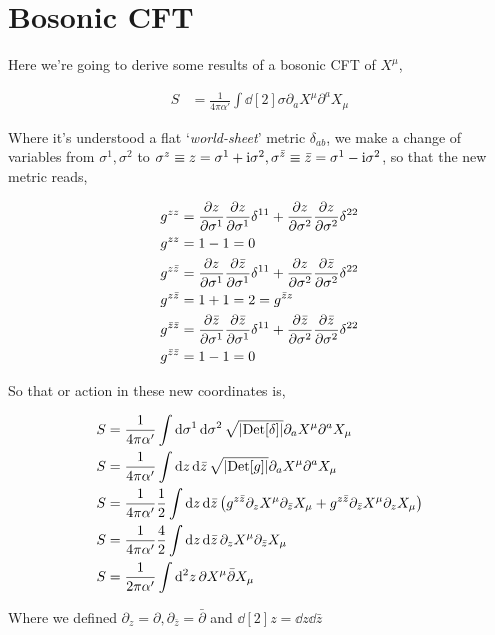 \section{Bosonic CFT}

Here we're going to derive some results of a bosonic CFT of $X^\mu$,

\begin{align*}
    S&=\frac{1}{4\pi\alpha'}\int\dd[2]{\sigma}\partial_a X^\mu\partial^a X_\mu
\end{align*}

Where it's understood a flat `\textit{world-sheet}' metric $\delta_{ab}$, we make a change of variables from $\sigma^1,\sigma^2$ to 
$\sigma^z\equiv z=\sigma^1+\textnormal{i} \sigma^2,\sigma^{\bar z}\equiv \bar z=\sigma^1-\textnormal{i} \sigma^2$, so that the new metric reads,

\begin{align*}
    g^{zz}&=\pdv{z}{\sigma^1}\pdv{z}{\sigma^1}\delta^{11}+\pdv{z}{\sigma^2}\pdv{z}{\sigma^2}\delta^{22}\\
    g^{zz}&=1-1=0\\
    g^{z\bar z}&=\pdv{z}{\sigma^1}\pdv{\bar z}{\sigma^1}\delta^{11}+\pdv{z}{\sigma^2}\pdv{\bar z}{\sigma^2}\delta^{22}\\
    g^{z\bar z}&=1+1=2=g^{\bar zz}\\
    g^{\bar z \bar z}&=\pdv{\bar z}{\sigma^1}\pdv{\bar z}{\sigma^1}\delta^{11}+\pdv{\bar z}{\sigma^2}\pdv{\bar z}{\sigma^2}\delta^{22}\\
    g^{\bar z \bar z}&=1-1=0
\end{align*}

So that or action in these new coordinates is,

\begin{align*}
    S&=\frac{1}{4\pi\alpha'}\int\dd{\sigma^1}\dd{\sigma^2}\sqrt{\abs{\textup{Det} \qty[\delta]}}\partial_a X^\mu\partial^a X_\mu\\
    S&=\frac{1}{4\pi\alpha'}\int\dd{z}\dd{\bar z}\sqrt{\abs{\textup{Det} \qty[g]}}\partial_a X^\mu\partial^a X_\mu\\
    S&=\frac{1}{4\pi\alpha'}\frac12\int\dd{z}\dd{\bar z}\qty(g^{z\bar z}\partial_z X^\mu\partial_{\bar z} X_\mu+g^{z\bar z}\partial_{\bar z} X^\mu\partial_{z} X_\mu)\\
    S&=\frac{1}{4\pi\alpha'}\frac42\int\dd{z}\dd{\bar z}\partial_z X^\mu\partial_{\bar z} X_\mu\\
    S&=\frac{1}{2\pi\alpha'}\int\dd[2]{z}\partial X^\mu\bar\partial X_\mu
\end{align*}

Where we defined $\partial_z=\partial,\partial_{\bar z}=\bar \partial$ and $\dd[2]{z}=\dd{z}\dd{\bar z}$